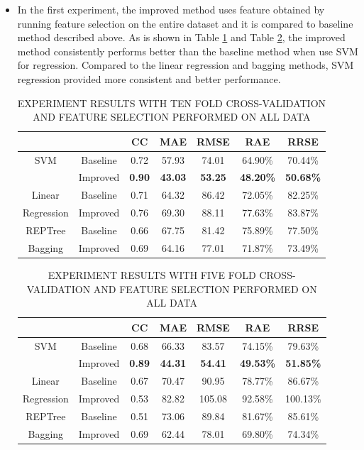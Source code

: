 \documentclass[11pt]{article} %
\begin{document}
\begin{itemize}[1)]

\item In the first experiment, the improved method uses feature obtained by running feature selection on the entire dataset and it is compared to baseline method described above. As is shown in Table \ref{tab:result1} and Table \ref{tab:result2}, the improved method consistently performs better than the baseline method when use SVM for regression. Compared to the linear regression and bagging methods, SVM regression provided more consistent and better performance.

\begin{table}
  \centering
  \caption{EXPERIMENT RESULTS WITH TEN FOLD CROSS-VALIDATION AND FEATURE SELECTION PERFORMED ON ALL DATA}
  \begin{tabular}{|c|c|c|c|c|c|c|}
     \hline
         &       & CC & MAE & RMSE & RAE & RRSE\\
     \hline
     SVM & Baseline & 0.72  & 57.93  & 74.01  & 64.90\%  & 70.44\%\\
         & Improved & \textbf{0.90}  & \textbf{43.03}  & \textbf{53.25}  & \textbf{48.20\%}  & \textbf{50.68\%}\\
     \hline
  Linear & Baseline &  0.71 & 64.32  & 86.42  & 72.05\% & 82.25\%\\
  Regression & Improved & 0.76  & 69.30  & 88.11  & 77.63\%  & 83.87\%  \\
  \hline
  REPTree & Baseline &  0.66 & 67.75  & 81.42  & 75.89\%  & 77.50\%\\
  Bagging & Improved &  0.69 & 64.16  & 77.01  & 71.87\%  & 73.49\%\\
  \hline
  \end{tabular}\label{tab:result1}
\end{table}

\begin{table}
  \centering
  \caption{EXPERIMENT RESULTS WITH FIVE FOLD CROSS-VALIDATION AND FEATURE SELECTION PERFORMED ON ALL DATA}
  \begin{tabular}{|c|c|c|c|c|c|c|}
     \hline
         &       & CC & MAE & RMSE & RAE & RRSE\\
     \hline
     SVM & Baseline & 0.68  & 66.33  & 83.57  & 74.15\%  & 79.63\%\\
         & Improved & \textbf{0.89}  & \textbf{44.31 } & \textbf{54.41}  & \textbf{49.53\% } & \textbf{51.85\%}\\
     \hline
  Linear & Baseline &  0.67 & 70.47  & 90.95  & 78.77\% & 86.67\%\\
  Regression & Improved & 0.53 & 82.82 & 105.08  & 92.58\%  & 100.13\%  \\
  \hline
  REPTree & Baseline &  0.51 & 73.06  & 89.84  & 81.67\%  & 85.61\%\\
  Bagging & Improved &  0.69 & 62.44  & 78.01  & 69.80\%  & 74.34\%\\
  \hline
  \end{tabular}\label{tab:result2}
\end{table}


\end{itemize}
\end{document}
